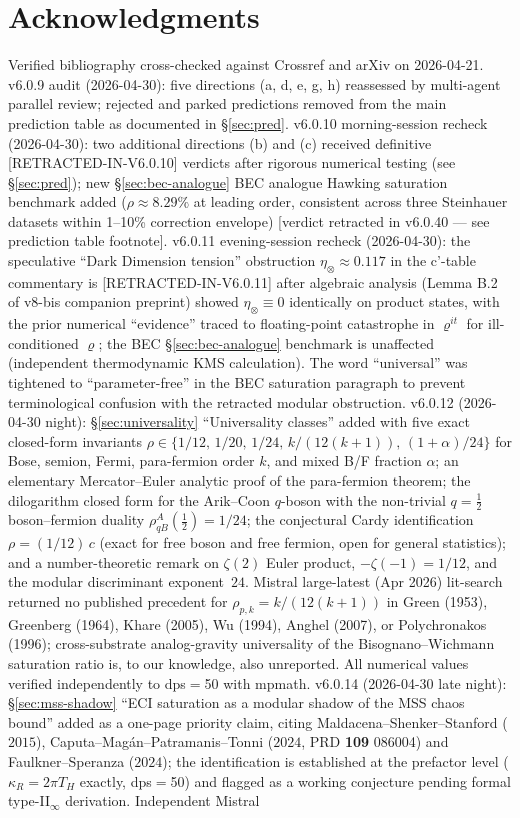 \documentclass[reprint,amsmath,amssymb,aps,prd,superscriptaddress]{revtex4-2}
\providecommand{\1}{\mathbf{1}}
\begin{document}
\section*{Acknowledgments}
Verified bibliography cross-checked against Crossref and arXiv on 2026-04-21. v6.0.9 audit (2026-04-30): five directions (a, d, e, g, h) reassessed by multi-agent parallel review; rejected and parked predictions removed from the main prediction table as documented in \S\ref{sec:pred}. v6.0.10 morning-session recheck (2026-04-30): two additional directions (b) and (c) received definitive [RETRACTED-IN-V6.0.10] verdicts after rigorous numerical testing (see \S\ref{sec:pred}); new \S\ref{sec:bec-analogue} BEC analogue Hawking saturation benchmark added ($\rho \approx 8.29\%$ at leading order, consistent across three Steinhauer datasets within 1--10\% correction envelope) [verdict retracted in v6.0.40 --- see prediction table footnote]. v6.0.11 evening-session recheck (2026-04-30): the speculative ``Dark Dimension tension'' obstruction $\eta_\otimes \approx 0.117$ in the c'-table commentary is [RETRACTED-IN-V6.0.11] after algebraic analysis (Lemma B.2 of v8-bis companion preprint) showed $\eta_\otimes \equiv 0$ identically on product states, with the prior numerical ``evidence'' traced to floating-point catastrophe in $\varrho^{it}$ for ill-conditioned $\varrho$; the BEC \S\ref{sec:bec-analogue} benchmark is unaffected (independent thermodynamic KMS calculation). The word ``universal'' was tightened to ``parameter-free'' in the BEC saturation paragraph to prevent terminological confusion with the retracted modular obstruction. v6.0.12 (2026-04-30 night): \S\ref{sec:universality} ``Universality classes'' added with five exact closed-form invariants $\rho \in \{1/12,\,1/20,\,1/24,\,k/(12(k+1)),\,(1+\alpha)/24\}$ for Bose, semion, Fermi, para-fermion order $k$, and mixed B/F fraction $\alpha$; an elementary Mercator--Euler analytic proof of the para-fermion theorem; the dilogarithm closed form for the Arik--Coon $q$-boson with the non-trivial $q{=}\tfrac{1}{2}$ boson--fermion duality $\rho^A_{qB}(\tfrac{1}{2})=1/24$; the conjectural Cardy identification $\rho = (1/12)\,c$ (exact for free boson and free fermion, open for general statistics); and a number-theoretic remark on $\zeta(2)$ Euler product, $-\zeta(-1)=1/12$, and the modular discriminant exponent~$24$. Mistral large-latest (Apr 2026) lit-search returned no published precedent for $\rho_{p,k} = k/(12(k+1))$ in Green (1953), Greenberg (1964), Khare (2005), Wu (1994), Anghel (2007), or Polychronakos (1996); cross-substrate analog-gravity universality of the Bisognano--Wichmann saturation ratio is, to our knowledge, also unreported. All numerical values verified independently to dps$=$50 with mpmath. v6.0.14 (2026-04-30 late night): \S\ref{sec:mss-shadow} ``ECI saturation as a modular shadow of the MSS chaos bound'' added as a one-page priority claim, citing Maldacena--Shenker--Stanford ($2015$), Caputa--Mag\'an--Patramanis--Tonni ($2024$, PRD \textbf{109} 086004) and Faulkner--Speranza ($2024$); the identification is established at the prefactor level ($\kappa_R = 2\pi T_H$ exactly, dps$=$50) and flagged as a working conjecture pending formal type-II$_\infty$ derivation. Independent Mistral 
\end{document}
